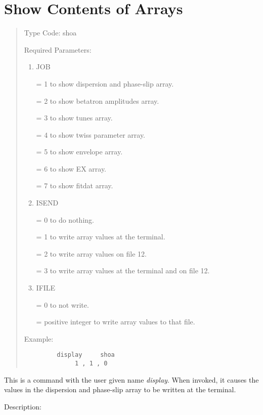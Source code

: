 \newpage
\section{Show Contents of Arrays}
\begin{quotation}
\noindent Type Code:  shoa  
\vspace{5mm}

\noindent Required Parameters:
\begin{enumerate}

      \item  JOB

             = 1 to show dispersion and phase-slip array.

             = 2 to show betatron amplitudes array.

			 = 3 to show tunes array.

			 = 4 to show twiss parameter array.

      			 = 5 to show envelope array.

			 = 6 to show EX array.

			 			 = 7 to show fitdat array.

      \item  ISEND

             = 0 to do nothing.

             = 1 to write array values at the terminal.

			 = 2 to write array values on file 12.

			 = 3 to write array values at the terminal and on file 12.
      \item  IFILE

	         = 0 to not write.

			 = positive integer to write array values to that file.
\end{enumerate}

						 \vspace{5mm}
\noindent Example:
\begin{verbatim}
         display     shoa
              1 , 1 , 0
\end{verbatim}
\end{quotation}

This is a command with the user given name {\em display}.  When invoked, it causes the values in the dispersion and phase-slip array to be written at the terminal.

\vspace{5mm}
     Description:
\vspace{2mm}

